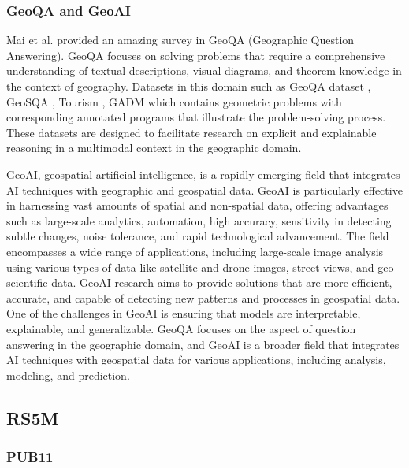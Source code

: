 \documentclass[journal]{IEEEtran}
\begin{document}
\subsubsection{GeoQA and GeoAI}

Mai et al. provided an amazing survey in GeoQA \cite{mai2021geographic} (Geographic Question Answering). GeoQA focuses on solving problems that require a comprehensive understanding of textual descriptions, visual diagrams, and theorem knowledge in the context of geography. Datasets in this domain such as GeoQA dataset \cite{chen2022geoqa}, GeoSQA \cite{huang2019geosqa}, Tourism \cite{Contractor_2021}, GADM \cite{punjani2021templatebased} which contains geometric problems with corresponding annotated programs that illustrate the problem-solving process. These datasets are designed to facilitate research on explicit and explainable reasoning in a multimodal context in the geographic domain.

GeoAI, geospatial artificial intelligence, is a rapidly emerging field that integrates AI techniques with geographic and geospatial data. GeoAI is particularly effective in harnessing vast amounts of spatial and non-spatial data, offering advantages such as large-scale analytics, automation, high accuracy, sensitivity in detecting subtle changes, noise tolerance, and rapid technological advancement. The field encompasses a wide range of applications, including large-scale image analysis using various types of data like satellite and drone images, street views, and geo-scientific data. GeoAI research aims to provide solutions that are more efficient, accurate, and capable of detecting new patterns and processes in geospatial data. One of the challenges in GeoAI is ensuring that models are interpretable, explainable, and generalizable. GeoQA focuses on the aspect of question answering in the geographic domain, and GeoAI is a broader field that integrates AI techniques with geospatial data for various applications, including analysis, modeling, and prediction. 


\subsection{RS5M}
\subsubsection{PUB11}
\label{appendix:pub11}
\end{document}
